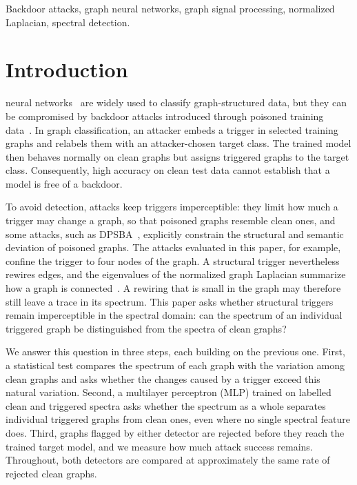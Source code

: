 \documentclass[journal]{IEEEtran}
\begin{document}
\begin{IEEEkeywords}
Backdoor attacks, graph neural networks, graph signal processing, normalized
Laplacian, spectral detection.
\end{IEEEkeywords}

\IEEEpeerreviewmaketitle

\section{Introduction}
 neural networks~\cite{gcn,gin} are widely used to classify
graph-structured data, but they can be compromised by backdoor attacks
introduced through poisoned training data~\cite{sba2021,gta2021}. In graph
classification, an attacker embeds a trigger in selected training graphs and
relabels them with an attacker-chosen target class. The trained model then
behaves normally on clean graphs but assigns triggered graphs to the target
class. Consequently, high accuracy on clean test data cannot establish that a
model is free of a backdoor.

To avoid detection, attacks keep triggers imperceptible: they limit how much a
trigger may change a graph, so that poisoned graphs resemble clean ones, and
some attacks, such as DPSBA~\cite{dpsba2025}, explicitly constrain the
structural and semantic deviation of poisoned graphs. The attacks evaluated in
this paper, for example, confine the trigger to four nodes of the graph. A
structural trigger nevertheless rewires edges, and the eigenvalues of the
normalized graph Laplacian summarize how a graph is
connected~\cite{chung1997spectral}. A rewiring that is small in the graph may
therefore still leave a trace in its spectrum. This paper asks whether
structural triggers remain imperceptible in the spectral domain: can the
spectrum of an individual triggered graph be distinguished from the spectra of
clean graphs?

We answer this question in three steps, each building on the previous one.
First, a statistical test compares the spectrum of each graph with the
variation among clean graphs and asks whether the changes caused by a trigger
exceed this natural variation. Second, a multilayer perceptron (MLP) trained on
labelled clean and triggered spectra asks whether the spectrum as a whole
separates individual triggered graphs from clean ones, even where no single
spectral feature does. Third, graphs flagged by either detector are rejected
before they reach the trained target model, and we measure how much attack
success remains. Throughout, both detectors are compared at approximately the
same rate of rejected clean graphs.
\end{document}
